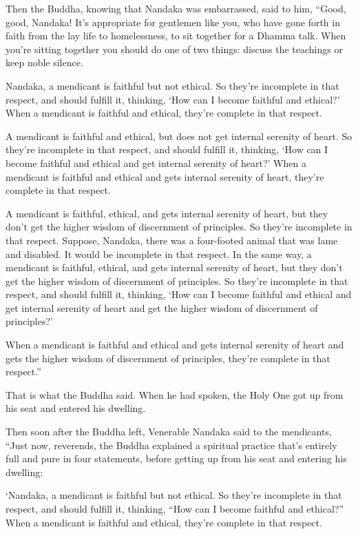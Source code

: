 \documentclass[12pt,openany]{book}%
\begin{document}
Then the Buddha, knowing that Nandaka was embarrassed, said to him, “Good, good, Nandaka! It’s appropriate for gentlemen like you, who have gone forth in faith from the lay life to homelessness, to sit together for a Dhamma talk. When you’re sitting together you should do one of two things: discuss the teachings or keep noble silence. 

Nandaka, a mendicant is faithful but not ethical. So they’re incomplete in that respect, and should fulfill it, thinking, ‘How can I become faithful and ethical?’ When a mendicant is faithful and ethical, they’re complete in that respect. 

A mendicant is faithful and ethical, but does not get internal serenity of heart. So they’re incomplete in that respect, and should fulfill it, thinking, ‘How can I become faithful and ethical and get internal serenity of heart?’ When a mendicant is faithful and ethical and gets internal serenity of heart, they’re complete in that respect. 

A mendicant is faithful, ethical, and gets internal serenity of heart, but they don’t get the higher wisdom of discernment of principles. So they’re incomplete in that respect. Suppose, Nandaka, there was a four-footed animal that was lame and disabled. It would be incomplete in that respect. In the same way, a mendicant is faithful, ethical, and gets internal serenity of heart, but they don’t get the higher wisdom of discernment of principles. So they’re incomplete in that respect, and should fulfill it, thinking, ‘How can I become faithful and ethical and get internal serenity of heart and get the higher wisdom of discernment of principles?’ 

When a mendicant is faithful and ethical and gets internal serenity of heart and gets the higher wisdom of discernment of principles, they’re complete in that respect.” 

That is what the Buddha said. When he had spoken, the Holy One got up from his seat and entered his dwelling. 

Then soon after the Buddha left, Venerable Nandaka said to the mendicants, “Just now, reverends, the Buddha explained a spiritual practice that’s entirely full and pure in four statements, before getting up from his seat and entering his dwelling: 

‘Nandaka, a mendicant is faithful but not ethical. So they’re incomplete in that respect, and should fulfill it, thinking, “How can I become faithful and ethical?” When a mendicant is faithful and ethical, they’re complete in that respect. 
\end{document}
